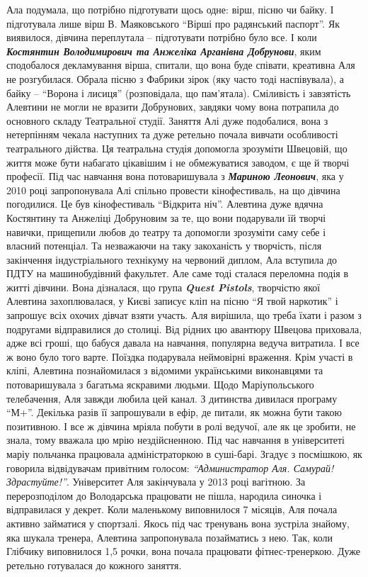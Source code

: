 Ала подумала, що потрібно підготувати щось одне:  вірш, пісню чи байку. І
підготувала лише вірш В. Маяковського \enquote{Вірші про радянський паспорт}. Як
виявилося, дівчина переплутала –  підготувати потрібно було все. І коли
\emph{\textbf{Костянтин Володимирович та Анжеліка Арганівна Добрунови}}, яким сподобалося
декламування вірша,  спитали, що вона буде співати, креативна Аля не
розгубилася. Обрала пісню з Фабрики зірок (яку часто тоді наспівувала), а байку
– \enquote{Ворона і лисиця} (розповідала, що пам'ятала). Сміливість і завзятість
Алевтини не могли не вразити Добрунових, завдяки чому вона потрапила до
основного складу Театральної студії. Заняття Алі дуже подобалися, вона з
нетерпінням чекала наступних та дуже ретельно почала вивчати особливості
театрального дійства. Ця театральна студія допомогла зрозуміти Швецовій, що
життя може бути набагато цікавішим і не обмежуватися заводом, є ще й творчі
професії. Під час навчання вона потоваришувала з \emph{\textbf{Мариною Леонович}}, яка у 2010
році запропонувала Алі спільно провести кінофестиваль, на що дівчина
погодилися. Це був кінофестиваль \enquote{Відкрита ніч}. Алевтина дуже вдячна
Костянтину та Анжеліці Добруновим за те, що вони подарували їй творчі навички,
прищепили любов до театру та допомогли зрозуміти саму себе і власний потенціал.
Та незважаючи на таку закоханість у творчість, після закінчення індустріального
технікуму на червоний диплом, Ала вступила до ПДТУ  на машинобудівний
факультет. Але саме тоді сталася  переломна подія в житті дівчини. Вона
дізналася, що група \emph{\textbf{Quest Pistols}}, творчістю якої Алевтина захоплювалася, у
Києві записує кліп на пісню \enquote{Я твой наркотик} і запрошує всіх охочих дівчат
взяти участь. Аля вирішила, що треба їхати і разом з подругами відправилися до
столиці. Від рідних цю авантюру Швецова приховала, адже всі гроші, що бабуся
давала на навчання, популярна ведуча витратила. І все ж воно було того варте.
Поїздка подарувала неймовірні враження. Крім участі в кліпі, Алевтина
познайомилася з відомими українськими виконавцями та потоваришувала з багатьма
яскравими людьми. Щодо Маріупольського телебачення, Аля завжди любила цей
канал. З дитинства дивилася програму \enquote{М+}. Декілька разів її запрошували в
ефір, де питали, як можна бути такою позитивною. І все ж дівчина мріяла побути
в ролі ведучої, але як це зробити, не знала, тому вважала цю мрію
нездійсненною. Під час навчання в університеті маріу  польчанка працювала
адміністраторкою в суші-барі. Згадує з посмішкою, як говорила відвідувачам
привітним голосом: \emph{\enquote{Администратор Аля. Самурай! Здрастуйте!}}. Університет Аля
закінчувала у 2013 році вагітною. За перерозподілом до Володарська працювати не
пішла, народила синочка і відправилася у декрет. Коли маленькому виповнилося 7
місяців, Аля почала активно  займатися  у спортзалі. Якось під час тренувань
вона зустріла знайому, яка шукала тренера, Алевтина запропонувала позайматись з
нею. Так, коли Глібчику виповнилося 1,5 рочки, вона почала працювати
фітнес-тренеркою. Дуже ретельно готувалася до кожного заняття.


